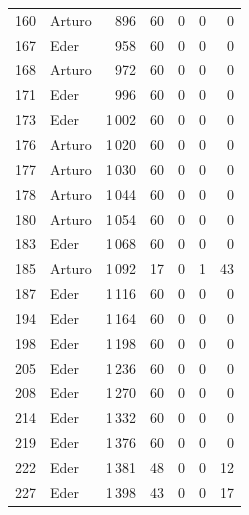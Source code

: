 \begin{longtable}{llrrrrr}
160 & Arturo & 896 & 60 & 0 & 0 & 0 \\
167 & Eder & 958 & 60 & 0 & 0 & 0 \\
168 & Arturo & 972 & 60 & 0 & 0 & 0 \\
171 & Eder & 996 & 60 & 0 & 0 & 0 \\
173 & Eder & 1\,002 & 60 & 0 & 0 & 0 \\
176 & Arturo & 1\,020 & 60 & 0 & 0 & 0 \\
177 & Arturo & 1\,030 & 60 & 0 & 0 & 0 \\
178 & Arturo & 1\,044 & 60 & 0 & 0 & 0 \\
180 & Arturo & 1\,054 & 60 & 0 & 0 & 0 \\
183 & Eder & 1\,068 & 60 & 0 & 0 & 0 \\
185 & Arturo & 1\,092 & 17 & 0 & 1 & 43 \\
187 & Eder & 1\,116 & 60 & 0 & 0 & 0 \\
194 & Eder & 1\,164 & 60 & 0 & 0 & 0 \\
198 & Eder & 1\,198 & 60 & 0 & 0 & 0 \\
205 & Eder & 1\,236 & 60 & 0 & 0 & 0 \\
208 & Eder & 1\,270 & 60 & 0 & 0 & 0 \\
214 & Eder & 1\,332 & 60 & 0 & 0 & 0 \\
219 & Eder & 1\,376 & 60 & 0 & 0 & 0 \\
222 & Eder & 1\,381 & 48 & 0 & 0 & 12 \\
227 & Eder & 1\,398 & 43 & 0 & 0 & 17 \\
\end{longtable}
